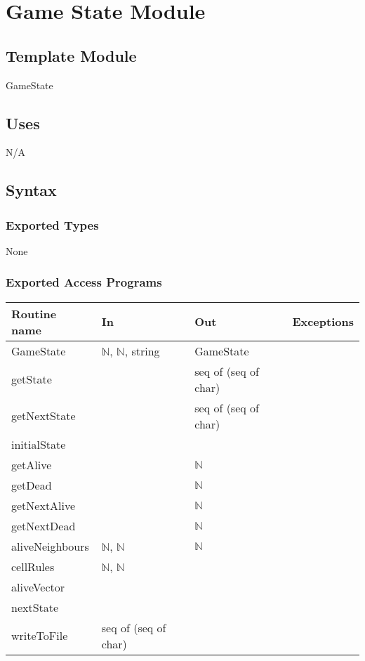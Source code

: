 \documentclass[12pt]{article}
\begin{document}
\newpage

\section* {Game State Module}

\subsection*{Template Module}

GameState

\subsection* {Uses}

N/A

\subsection* {Syntax}

\subsubsection* {Exported Types}

\noindent None

\subsubsection* {Exported Access Programs}

\begin{tabular}{| l | l | l | l |}
\hline
\textbf{Routine name} & \textbf{In} & \textbf{Out} & \textbf{Exceptions}\\
\hline
GameState & $\mathbb{N}$, $\mathbb{N}$, string & GameState & \\
\hline
getState & ~ & seq of (seq of char) & ~\\
\hline
getNextState & ~ & seq of (seq of char) & ~\\
\hline
initialState & ~ & ~ & ~\\
\hline
getAlive & ~ & $\mathbb{N}$ & ~\\
\hline
getDead & ~ & $\mathbb{N}$ & ~\\
\hline
getNextAlive & ~ & $\mathbb{N}$ & ~\\
\hline
getNextDead & ~ & $\mathbb{N}$ & ~\\
\hline
aliveNeighbours & $\mathbb{N}$, $\mathbb{N}$ & $\mathbb{N}$ & ~\\
\hline
cellRules & $\mathbb{N}$, $\mathbb{N}$ & ~ & ~\\
\hline
aliveVector & ~ & ~ & ~\\
\hline
nextState & ~ & ~ & ~\\
\hline
writeToFile & seq of (seq of char) & ~ & ~\\
\hline
\end{tabular}
\end{document}

